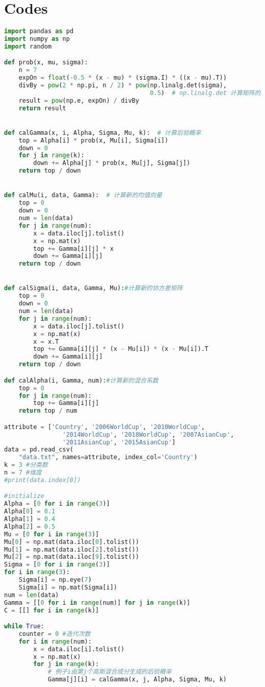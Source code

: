 ﻿\documentclass[a4paper, 11pt]{article}
\numberwithin{equation}{subsection}
\begin{document}
\section{Codes}
\begin{lstlisting}[title = EM.py,language=Python,frame=single]
import pandas as pd
import numpy as np
import random

def prob(x, mu, sigma):
    n = 7
    expOn = float(-0.5 * (x - mu) * (sigma.I) * ((x - mu).T))
    divBy = pow(2 * np.pi, n / 2) * pow(np.linalg.det(sigma),
                                        0.5)  # np.linalg.det 计算矩阵的行列式
    result = pow(np.e, expOn) / divBy
    return result


def calGamma(x, i, Alpha, Sigma, Mu, k):  # 计算后验概率
    top = Alpha[i] * prob(x, Mu[i], Sigma[i])
    down = 0
    for j in range(k):
        down += Alpha[j] * prob(x, Mu[j], Sigma[j])
    return top / down


def calMu(i, data, Gamma):  # 计算新的均值向量
    top = 0
    down = 0
    num = len(data)
    for j in range(num):
        x = data.iloc[j].tolist()
        x = np.mat(x)
        top += Gamma[i][j] * x
        down += Gamma[i][j]
    return top / down


def calSigma(i, data, Gamma, Mu):#计算新的协方差矩阵
    top = 0
    down = 0
    num = len(data)
    for j in range(num):
        x = data.iloc[j].tolist()
        x = np.mat(x)
        x = x.T
        top += Gamma[i][j] * (x - Mu[i]) * (x - Mu[i]).T
        down += Gamma[i][j]
    return top / down

def calAlpha(i, Gamma, num):#计算新的混合系数
    top = 0
    for j in range(num):
        top += Gamma[i][j]
    return top / num

attribute = ['Country', '2006WorldCup', '2010WorldCup',
                '2014WorldCup', '2018WorldCup', '2007AsianCup',
                '2011AsianCup', '2015AsianCup']
data = pd.read_csv(
    "data.txt", names=attribute, index_col='Country')
k = 3 #分类数
n = 7 #维度
#print(data.index[0])

#initialize
Alpha = [0 for i in range(3)]
Alpha[0] = 0.1
Alpha[1] = 0.4
Alpha[2] = 0.5
Mu = [0 for i in range(3)]
Mu[0] = np.mat(data.iloc[0].tolist())
Mu[1] = np.mat(data.iloc[2].tolist())
Mu[2] = np.mat(data.iloc[9].tolist())
Sigma = [0 for i in range(3)]
for i in range(3):
    Sigma[i] = np.eye(7)
    Sigma[i] = np.mat(Sigma[i])
num = len(data)
Gamma = [[0 for i in range(num)] for j in range(k)]
C = [[] for i in range(k)]

while True:
    counter = 0 #迭代次数
    for i in range(num):
        x = data.iloc[i].tolist()
        x = np.mat(x)
        for j in range(k):
            # 例子i由第j个高斯混合成分生成的后验概率
            Gamma[j][i] = calGamma(x, j, Alpha, Sigma, Mu, k)


\end{lstlisting}
\end{document}
